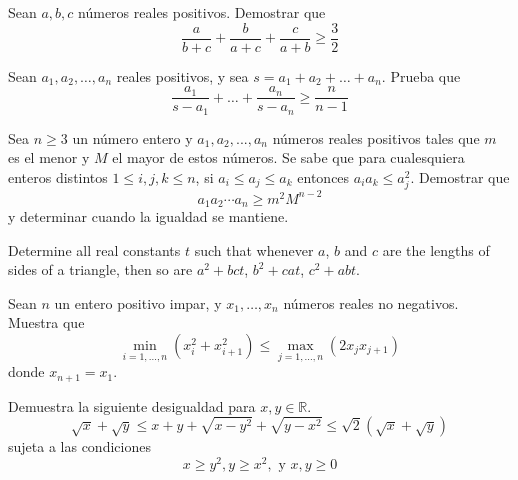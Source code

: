 \documentclass[11pt]{scrartcl}
\begin{document}
\begin{problem} [Nesbit]
Sean $a, b, c$ n\'umeros reales positivos. Demostrar que
\begin{equation*}
    \frac{a}{b+c} + \frac{b}{a+c} + \frac{c}{a+b} \geq \frac{3}{2}
\end{equation*}
\label{NESBITT}
\end{problem}

\begin{problem} 
    Sean $a_1,a_2,\ldots, a_n$ reales positivos, y sea $s=a_1+a_2+\ldots+a_n$. Prueba que 
    \[\frac{a_1}{s-a_1}+\ldots+\frac{a_n}{s-a_n} \geq \frac{n}{n-1}\]
\end{problem}

\begin{problem} [OMCC 2021/5]
    
    Sea $n \geq 3$ un número entero y $a_1,a_2,...,a_n$ números reales positivos tales que $m$ es el menor y $M$ el mayor de estos números. Se sabe que para cualesquiera enteros distintos $1 \leq i,j,k \leq n$, si $a_i \leq a_j \leq a_k$ entonces $a_ia_k \leq a_j^2$. Demostrar que
\[ a_1a_2 \cdots a_n \geq m^2M^{n-2} \]
y determinar cuando la igualdad se mantiene.

\end{problem}

\begin{problem} [EGMO 2014/1]
    Determine all real constants $t$ such that whenever $a$, $b$ and $c$ are the lengths of sides of a triangle, then so are $a^2+bct$, $b^2+cat$, $c^2+abt$.
\end{problem}

\begin{problem}
    [EGMO 2016/1]
    Sean $n$ un entero positivo impar, y $x_1, \dots, x_n$ números reales no negativos. Muestra
que
\[ \min_{i=1,\ldots,n} (x_i^2+x_{i+1}^2) \leq \max_{j=1,\ldots,n} (2x_jx_{j+1}) \]
donde $x_{n+1}= x_1$.
    
\end{problem}

\begin{problem}  
    Demuestra la siguiente desigualdad para $x, y \in \mathbb{R}$. 
    \[ \sqrt{x}+ \sqrt{y} \leq x+y+\sqrt{x-y^2}+\sqrt{y-x^2} \leq \sqrt{2} \left(  \sqrt{x}+\sqrt{y} \right)\]
    sujeta a las condiciones
    \[x \geq y^2 , y\geq x^2 , \text{ y } x,y \geq 0 \]
\end{problem}
\end{document}
